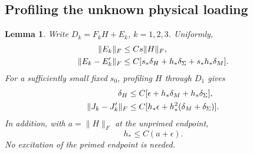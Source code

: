 \documentclass[11pt,a4paper]{amsart}
\theoremstyle{plain}
\newtheorem{lemma}[theorem]{Lemma}
\theoremstyle{definition}
\theoremstyle{remark}
\begin{document}
\subsection{Profiling the unknown physical loading}

\begin{lemma}\label{lem:profile}
Write $D_k=F_kH+E_k$, $k=1,2,3$. Uniformly,
\begin{align}\label{eq:E-bounds}
 \|E_k\|_F&\le Cs\|H\|_F,\notag\\
 \|E_k-E_k'\|_F&\le C[s_*\delta_H+h_*\delta_\Sigma
                                      +s_*h_*\delta_M].
\end{align}
For a sufficiently small fixed $s_0$, profiling $H$ through $D_1$ gives
\begin{align}\label{eq:H-profile}
 \delta_H&\le C[\epsilon+h_*\delta_M+h_*\delta_\Sigma],\notag\\
 \|J_k-J_k'\|_F&\le C[h_*\epsilon+h_*^2(\delta_M+\delta_\Sigma)].
\end{align}
In addition, with $a=\|H\|_F$ at the unprimed endpoint,
\begin{equation}\label{eq:amplitude}
 h_*\le C(a+\epsilon).
\end{equation}
No excitation of the primed endpoint is needed.
\end{lemma}
\end{document}
